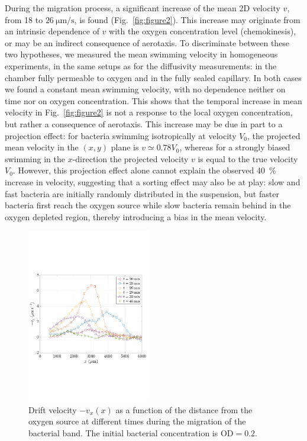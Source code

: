 \documentclass[aps,a4paper,twocolumn,10pt,pre,showpacs]{revtex4-2}
\begin{document}
During the migration process, a significant increase of the mean 2D velocity $v$, from 18 to $\SI{26}{\um\per\s}$, is found (Fig.~\ref{fig:figure2}). This increase may originate from an intrinsic dependence of $v$ with the oxygen concentration level (chemokinesis), or may be an indirect consequence of aerotaxis. To discriminate between these two hypotheses, we measured the mean swimming velocity in homogeneous experiments, in the same setups as for the diffusivity measurements: in the chamber fully permeable to oxygen and in the fully sealed capillary. In both cases we found a constant mean swimming velocity, with no dependence neither on time nor on oxygen concentration. This shows that the temporal increase in mean velocity in Fig.~\ref{fig:figure2} is not a response to the local oxygen concentration, but rather a consequence of aerotaxis. This increase may be due in part to a projection effect: for bacteria swimming isotropically at velocity $V_0$, the projected mean velocity in the $(x,y)$ plane is $v \simeq 0.78 V_0$, whereas for a strongly biased swimming in the $x$-direction the projected velocity $v$ is equal to the true velocity $V_0$. However, this projection effect alone cannot explain the observed \SI{40}{\%} increase in velocity, suggesting that a sorting effect may also be at play: slow and fast bacteria are initially randomly distributed in the suspension, but faster bacteria first reach the oxygen source while slow bacteria remain behind in the oxygen depleted region, thereby introducing a bias in the mean velocity.

\begin{figure}[tb]
\includegraphics[trim = 2mm 65mm 4mm 70mm, clip, width=0.48\textwidth, angle=0]{Fig04.pdf}
\caption{Drift velocity $-v_x(x)$ as a function of the distance from the oxygen source at different times during the migration of the bacterial band. The initial bacterial concentration is $\text{OD}=0.2$.}   
\label{fig:Vx_x}
\end{figure}
\end{document}
